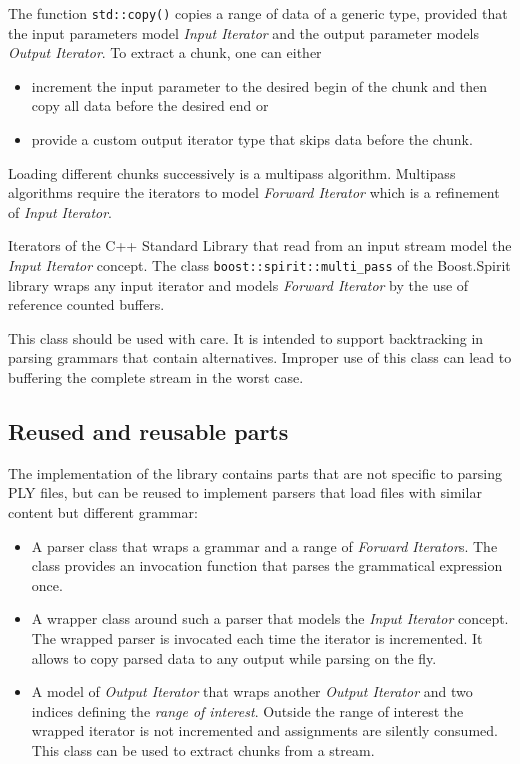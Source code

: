 \documentclass[a4paper, parskip=half, twocolumn]{scrartcl}
\begin{document}
The function \texttt{std::copy()} copies a range of data of a generic type,
provided that the input parameters model \emph{Input Iterator} and the output
parameter models \emph{Output Iterator}. To extract a chunk, one can either
\begin{itemize}
  \item increment the input parameter to the desired begin of the chunk and then
  copy all data before the desired end or
  \item provide a custom output iterator type that skips data before the chunk.
\end{itemize}

Loading different chunks successively is a multipass algorithm. Multipass
algorithms require the iterators to model \emph{Forward Iterator} which is a
refinement of \emph{Input Iterator}.

Iterators of the C++ Standard Library that read from an input stream model the
\emph{Input Iterator} concept. The class \texttt{boost::spirit::multi\_pass} of
the Boost.Spirit library wraps any input iterator and models \emph{Forward
Iterator} by the use of reference counted buffers.

This class should be used with care. It is intended to support backtracking in
parsing grammars that contain alternatives. Improper use of this class can lead
to buffering the complete stream in the worst case.

\subsection{Reused and reusable parts}

The implementation of the library contains parts that are not specific to
parsing PLY files, but can be reused to implement parsers that load files with
similar content but different grammar:

\begin{itemize}
  \item A parser class that wraps a grammar and a range of \emph{Forward
  Iterator}s. The class provides an invocation function that parses the
  grammatical expression once.
  \item A wrapper class around such a parser that models the \emph{Input
  Iterator} concept. The wrapped parser is invocated each time the iterator is
  incremented. It allows to copy parsed data to any output while parsing on the
  fly.
  \item A model of \emph{Output Iterator} that wraps another \emph{Output
  Iterator} and two indices defining the \emph{range of interest}. Outside the
  range of interest the wrapped iterator is not incremented and assignments are
  silently consumed. This class can be used to extract chunks from a stream.
\end{itemize}
\end{document}
